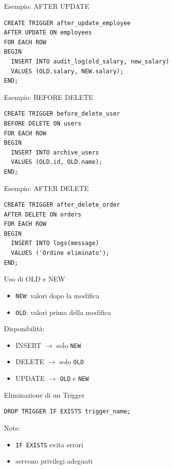 \documentclass{beamer}
\begin{document}
	\begin{frame}[fragile]{Esempio: AFTER UPDATE}
		\begin{lstlisting}
CREATE TRIGGER after_update_employee
AFTER UPDATE ON employees
FOR EACH ROW
BEGIN
  INSERT INTO audit_log(old_salary, new_salary)
  VALUES (OLD.salary, NEW.salary);
END;
		\end{lstlisting}
	\end{frame}
	
	\begin{frame}[fragile]{Esempio: BEFORE DELETE}
		\begin{lstlisting}
CREATE TRIGGER before_delete_user
BEFORE DELETE ON users
FOR EACH ROW
BEGIN
  INSERT INTO archive_users
  VALUES (OLD.id, OLD.name);
END;
		\end{lstlisting}
	\end{frame}
	
	\begin{frame}[fragile]{Esempio: AFTER DELETE}
		\begin{lstlisting}
CREATE TRIGGER after_delete_order
AFTER DELETE ON orders
FOR EACH ROW
BEGIN
  INSERT INTO logs(message)
  VALUES ('Ordine eliminato');
END;
		\end{lstlisting}
	\end{frame}
	
	\begin{frame}{Uso di OLD e NEW}
		\begin{itemize}
			\item \texttt{NEW}: valori dopo la modifica
			\item \texttt{OLD}: valori prima della modifica
		\end{itemize}
		
		\bigskip
		
		Disponibilità:
		\begin{itemize}
			\item INSERT $\rightarrow$ solo \texttt{NEW}
			\item DELETE $\rightarrow$ solo \texttt{OLD}
			\item UPDATE $\rightarrow$ \texttt{OLD} e \texttt{NEW}
		\end{itemize}
	\end{frame}
	
	\begin{frame}[fragile]{Eliminazione di un Trigger}
		\begin{lstlisting}
DROP TRIGGER IF EXISTS trigger_name;
		\end{lstlisting}
		
		\bigskip
		
		Note:
		\begin{itemize}
			\item \texttt{IF EXISTS} evita errori
			\item servono privilegi adeguati
		\end{itemize}
	\end{frame}
	
\end{document}
